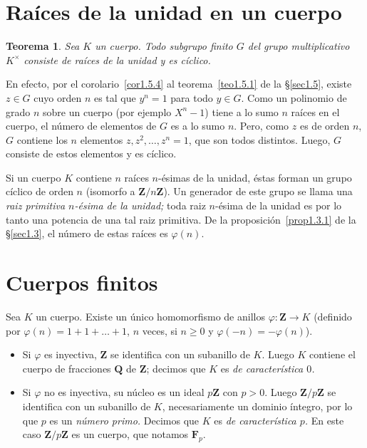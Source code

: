 \documentclass[bibtotoc,leqno,spanish]{amsbook}
\newcommand{\QQ}{\mathbf{Q}}
\newcommand{\ZZ}{\mathbf{Z}}
\newcommand{\FF}{\mathbf{F}}
\newcommand{\QED}{LQQD.}
\renewcommand{\to}[1][]{\xrightarrow{#1}}
\numberwithin{equation}{section}
\theoremstyle{note}
\theoremstyle{note}
\newtheorem{theorem}{Teorema}
\theoremstyle{rem}
\numberwithin{theorem}{section}
\numberwithin{proposition}{section}
\numberwithin{definition}{section}
\numberwithin{lemma}{section}
\numberwithin{corollary}{section}
\numberwithin{example}{section}
\numberwithin{footnote}{section}%
\begin{document}
\section{Ra\'ices de la unidad en un cuerpo}\label{sec1.6}

\begin{theorem}\label{teo1.6.1}
Sea $K$ un cuerpo. Todo subgrupo finito $G$ del grupo
multiplicativo $K^{\times}$ consiste de ra\'ices de la unidad y
es c\'iclico.
\end{theorem}

En efecto, por el corolario~\ref{cor1.5.4} al teorema~\ref{teo1.5.1}
de la \S\ref{sec1.5}, existe $z\in G$ cuyo orden $n$ es tal que $y^{n}=1$
para todo $y\in G$. Como un polinomio de grado $n$ sobre un cuerpo
(por ejemplo $X^{n}-1$) tiene a lo sumo $n$ ra\'ices en el
cuerpo, el n\'umero de elementos de $G$ es a lo sumo $n$.
Pero, como $z$ es de orden $n$, $G$ contiene los $n$ elementos
$z, z^{2},\dots,z^{n}=1$, que son todos distintos. Luego, $G$
consiste de estos elementos y es c\'iclico.%

Si un cuerpo $K$ contiene $n$ ra\'ices $n$-\'esimas de la unidad,
\'estas forman un grupo c\'iclico de orden $n$ (isomorfo a
$\ZZ/n\ZZ$). Un generador de este grupo se llama una
{\em raiz primitiva $n$-\'esima de la unidad;} toda raiz $n$-\'esima
de la unidad es por lo tanto una potencia de una tal raiz primitiva.
De la proposici\'on~\ref{prop1.3.1} de la \S\ref{sec1.3}, el n\'umero de estas ra\'ices
es $\varphi(n)$.

\section{Cuerpos finitos}\label{sec1.7}

Sea $K$ un cuerpo. Existe un \'unico homomorfismo de anillos
$\varphi:\ZZ\to K$ (definido por $\varphi(n)=1+1+\dots+1$,
$n$ veces, si $n\geq 0$ y $\varphi(-n) = -\varphi(n)$).

\begin{itemize}
\item Si $\varphi$ es inyectiva, $\ZZ$ se identifica con un
subanillo de $K$. Luego $K$ contiene el cuerpo de fracciones
$\QQ$ de $\ZZ$; decimos que $K$ es {\em de caracter\'istica
$0$.}
\item Si $\varphi$ no es inyectiva, su n\'ucleo es un ideal
$p\ZZ$ con $p > 0$. Luego $\ZZ/p\ZZ$ se identifica con un
subanillo de $K$, necesariamente un dominio \'integro, por
lo que $p$ es un {\em n\'umero primo.} Decimos que $K$ es
{\em de caracter\'istica $p$.} En este caso $\ZZ/p\ZZ$ es un
cuerpo, que notamos $\FF_{p}$.
\end{itemize}
\end{document}
